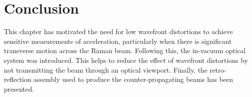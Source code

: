 \section{Conclusion}
This chapter has motivated the need for low wavefront distortions to achieve sensitive measurements of acceleration, particularly when there is significant transverse motion across the Raman beam. Following this, the in-vacuum optical system was introduced. This helps to reduce the effect of wavefront distortions by not transmitting the beam through an optical viewport. Finally, the retro-reflection assembly used to produce the counter-propagating beams has been presented.  
